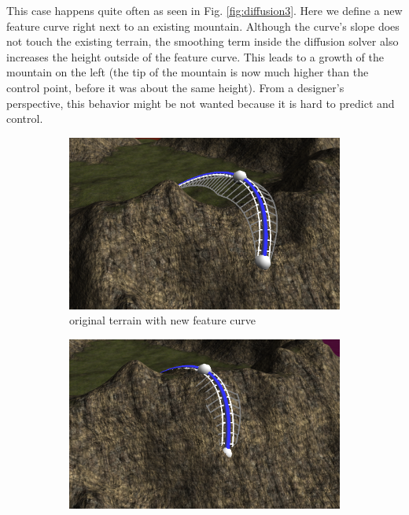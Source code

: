 \documentclass[journal, letterpaper]{IEEEtran}
\begin{document}
This case happens quite often as seen in Fig. \ref{fig:diffusion3}. Here we define a new feature curve right next to an existing mountain. Although the curve's slope does not touch the existing terrain, the smoothing term inside the diffusion solver also increases the height outside of the feature curve. This leads to a growth of the mountain on the left (the tip of the mountain is now much higher than the control point, before it was about the same height).
From a designer's perspective, this behavior might be not wanted because it is hard to predict and control.

\begin{figure}
	\centering
	\begin{subfigure}[b]{0.3\textwidth}
		\includegraphics[width=\textwidth]{images/diffusionError1}
		\caption{original terrain with new feature curve}
		\label{fig:diffusionError1}
	\end{subfigure}
	\begin{subfigure}[b]{0.3\textwidth}
		\includegraphics[width=\textwidth]{images/diffusionError2}

\end{subfigure}
\end{figure}
\end{document}
